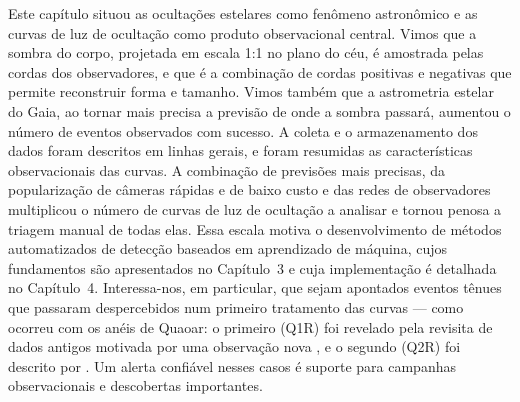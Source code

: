 Este capítulo situou as ocultações estelares como fenômeno astronômico e as curvas de luz de ocultação como produto observacional central. Vimos que a sombra do corpo, projetada em escala 1:1 no plano do céu, é amostrada pelas cordas dos observadores, e que é a combinação de cordas positivas e negativas que permite reconstruir forma e tamanho. Vimos também que a astrometria estelar do Gaia, ao tornar mais precisa a previsão de onde a sombra passará, aumentou o número de eventos observados com sucesso. A coleta e o armazenamento dos dados foram descritos em linhas gerais, e foram resumidas as características observacionais das curvas. A combinação de previsões mais precisas, da popularização de câmeras rápidas e de baixo custo e das redes de observadores multiplicou o número de curvas de luz de ocultação a analisar e tornou penosa a triagem manual de todas elas. Essa escala motiva o desenvolvimento de métodos automatizados de detecção baseados em aprendizado de máquina, cujos fundamentos são apresentados no Capítulo~3 e cuja implementação é detalhada no Capítulo~4. Interessa-nos, em particular, que sejam apontados eventos tênues que passaram despercebidos num primeiro tratamento das curvas --- como ocorreu com os anéis de Quaoar: o primeiro (Q1R) foi revelado pela revisita de dados antigos motivada por uma observação nova \citep{Morgado2023}, e o segundo (Q2R) foi descrito por \citet{Quaoar2023}. Um alerta confiável nesses casos é suporte para campanhas observacionais e descobertas importantes.
